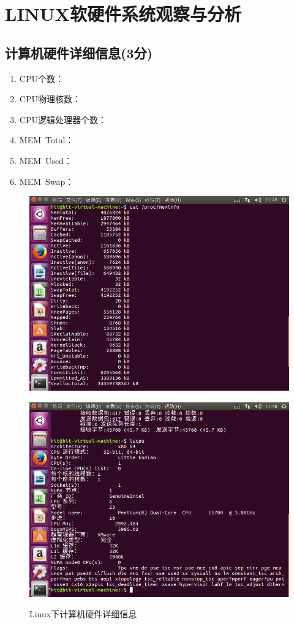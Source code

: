 \section{LINUX软硬件系统观察与分析}
\subsection{计算机硬件详细信息(3分)}
\begin{enumerate}
	\item CPU个数：
	\item CPU物理核数：
	\item CPU逻辑处理器个数：
	\item MEM\ Total：  
	\item MEM\ Used：    
	\item MEM\ Swap：  
\end{enumerate}

\begin{figure}[H]
	\begin{minipage}[c]{0.5\linewidth}
		\centering
		\includegraphics[width=0.7\linewidth]{figures/Lin-Mem}
		\label{fig:lin-mem}
	\end{minipage}
	\begin{minipage}[c]{0.5\linewidth}
		\centering
		\includegraphics[width=0.7\linewidth]{figures/Lin-Cpu}
		\label{fig:lin-cpu}
	\end{minipage}
	\caption{Linux下计算机硬件详细信息}
\end{figure}

